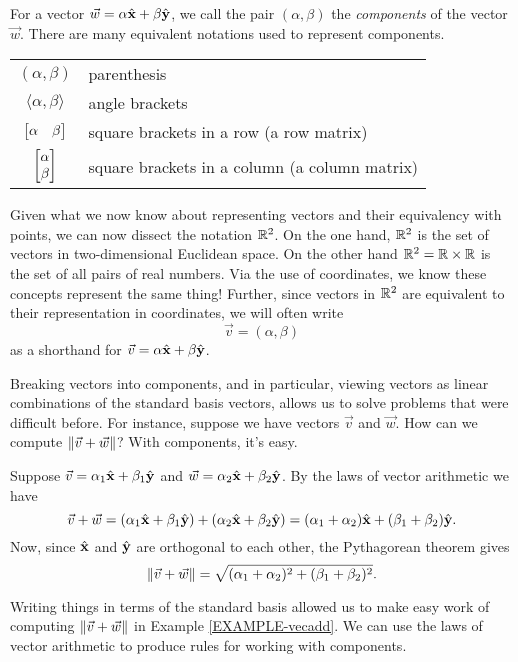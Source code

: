 For a vector $\vec w=\alpha{\hat {\mathbf x}}+\beta{\hat {\mathbf y}}$,
we call the pair $(\alpha,\beta)$  the 
\emph{components} of the vector $\vec w$.  There
are many equivalent notations used to represent components.
\begin{center}
	\begin{tabular}{c p{5cm}}
		$(\alpha,\beta)$ & parenthesis\\
		$\langle \alpha,\beta\rangle$ & angle brackets\\
		$\mat{\alpha&\beta}$ & square brackets in a row (a row matrix)\\
		$\mat{\alpha\\\beta}$ & square brackets in a column (a column matrix)\\
	\end{tabular}
\end{center}

Given what we now know about representing vectors and their equivalency
with points, we can now dissect the notation $\mathbb{R}^2$.
On the one hand, $\mathbb{R}^2$ is the set of vectors in two-dimensional Euclidean
space.  On the other hand $\mathbb{R}^2=\mathbb{R}\times \mathbb{R}$ is the set of all pairs of real 
numbers.  Via the use of coordinates, we know these concepts represent the
same thing!
Further,
since vectors in $\mathbb{R}^2$ are equivalent to their representation in coordinates,
we will often write
\[
	\vec v=(\alpha,\beta)
\]
as a shorthand for $\vec v=\alpha{\hat {\mathbf x}}+\beta{\hat {\mathbf y}}$.


Breaking vectors into components, and in particular, viewing vectors as linear
combinations of the standard basis vectors, allows us to solve problems that were
difficult before.  For instance, suppose we have vectors $\vec v$ and $\vec w$.
How can we compute $\lVert\vec v+\vec w\rVert$?  With components, it's easy.

\begin{example}
	\label{EXAMPLE-vecadd}
	Suppose $\vec v=\alpha_1{\hat {\mathbf x}}+\beta_1{\hat {\mathbf y}}$ and $\vec w=\alpha_2{\hat {\mathbf x}}+\beta_2{\hat {\mathbf y}}$.
	By the laws of vector arithmetic we have
	\[
		\vec v+\vec w=(\alpha_1{\hat {\mathbf x}}+\beta_1{\hat {\mathbf y}})+(\alpha_2{\hat {\mathbf x}}+\beta_2{\hat {\mathbf y}})
		=(\alpha_1+\alpha_2){\hat {\mathbf x}}+(\beta_1+\beta_2){\hat {\mathbf y}}.
	\]
	Now, since ${\hat {\mathbf x}}$ and ${\hat {\mathbf y}}$ are orthogonal to each other,
	the Pythagorean theorem gives
	\[
		\lVert\vec v+\vec w\rVert = \sqrt{(\alpha_1+\alpha_2)^2+(\beta_1+\beta_2)^2}.
	\]
\end{example}

Writing things in terms of the standard basis allowed us to make easy work
of computing $\lVert\vec v+\vec w\rVert$ in Example \ref{EXAMPLE-vecadd}.  We can
use the laws of vector arithmetic to produce rules for working with components.


